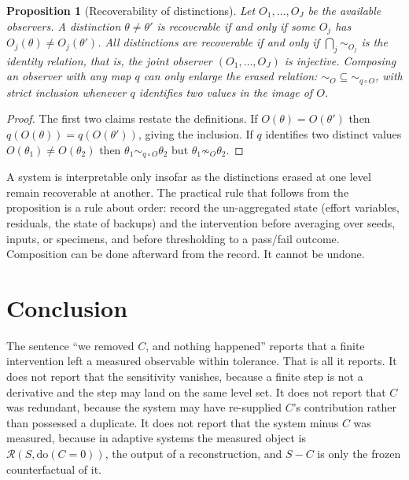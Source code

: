 \documentclass[11pt]{article}
\newtheorem{proposition}[theorem]{Proposition}
\theoremstyle{definition}
\theoremstyle{remark}
\newcommand{\Rop}{\mathcal{R}}
\newcommand{\dox}[1]{\mathrm{do}(#1)}
\begin{document}
\begin{proposition}[Recoverability of distinctions]\label{prop:recover}
Let $O_1,\dots,O_J$ be the available observers. A distinction $\theta\ne\theta'$ is recoverable if and only if some $O_j$ has $O_j(\theta)\ne O_j(\theta')$. All distinctions are recoverable if and only if $\bigcap_j\sim_{O_j}$ is the identity relation, that is, the joint observer $(O_1,\dots,O_J)$ is injective. Composing an observer with any map $q$ can only enlarge the erased relation: $\sim_O\subseteq\sim_{q\circ O}$, with strict inclusion whenever $q$ identifies two values in the image of $O$.
\end{proposition}
\begin{proof}
The first two claims restate the definitions. If $O(\theta)=O(\theta')$ then $q(O(\theta))=q(O(\theta'))$, giving the inclusion. If $q$ identifies two distinct values $O(\theta_1)\ne O(\theta_2)$ then $\theta_1\sim_{q\circ O}\theta_2$ but $\theta_1\not\sim_O\theta_2$.
\end{proof}

A system is interpretable only insofar as the distinctions erased at one level remain recoverable at another. The practical rule that follows from the proposition is a rule about order: record the un-aggregated state (effort variables, residuals, the state of backups) and the intervention before averaging over seeds, inputs, or specimens, and before thresholding to a pass/fail outcome. Composition can be done afterward from the record. It cannot be undone.

\section{Conclusion}

The sentence ``we removed $C$, and nothing happened'' reports that a finite intervention left a measured observable within tolerance. That is all it reports. It does not report that the sensitivity vanishes, because a finite step is not a derivative and the step may land on the same level set. It does not report that $C$ was redundant, because the system may have re-supplied $C$'s contribution rather than possessed a duplicate. It does not report that the system minus $C$ was measured, because in adaptive systems the measured object is $\Rop(S,\dox{C=0})$, the output of a reconstruction, and $S-C$ is only the frozen counterfactual of it.
\end{document}
